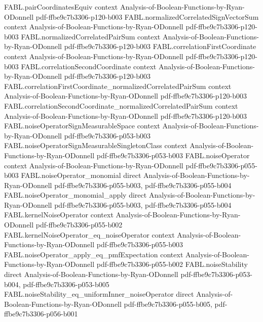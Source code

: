 \begin{theorem}
  {FABL.pairCoordinatesEquiv}
  {context}
  {Analysis-of-Boolean-Functions-by-Ryan-ODonnell}
  {pdf-ffbe9c7b3306-p120-b003}
\proofstep
  {FABL.normalizedCorrelatedSignVectorSum}
  {context}
  {Analysis-of-Boolean-Functions-by-Ryan-ODonnell}
  {pdf-ffbe9c7b3306-p120-b003}
\proofstep
  {FABL.normalizedCorrelatedPairSum}
  {context}
  {Analysis-of-Boolean-Functions-by-Ryan-ODonnell}
  {pdf-ffbe9c7b3306-p120-b003}
\proofstep
  {FABL.correlationFirstCoordinate}
  {context}
  {Analysis-of-Boolean-Functions-by-Ryan-ODonnell}
  {pdf-ffbe9c7b3306-p120-b003}
\proofstep
  {FABL.correlationSecondCoordinate}
  {context}
  {Analysis-of-Boolean-Functions-by-Ryan-ODonnell}
  {pdf-ffbe9c7b3306-p120-b003}
\proofstep
  {FABL.correlationFirstCoordinate_normalizedCorrelatedPairSum}
  {context}
  {Analysis-of-Boolean-Functions-by-Ryan-ODonnell}
  {pdf-ffbe9c7b3306-p120-b003}
\proofstep
  {FABL.correlationSecondCoordinate_normalizedCorrelatedPairSum}
  {context}
  {Analysis-of-Boolean-Functions-by-Ryan-ODonnell}
  {pdf-ffbe9c7b3306-p120-b003}
\proofstep
  {FABL.noiseOperatorSignMeasurableSpace}
  {context}
  {Analysis-of-Boolean-Functions-by-Ryan-ODonnell}
  {pdf-ffbe9c7b3306-p053-b003}
\proofstep
  {FABL.noiseOperatorSignMeasurableSingletonClass}
  {context}
  {Analysis-of-Boolean-Functions-by-Ryan-ODonnell}
  {pdf-ffbe9c7b3306-p053-b003}
\proofstep
  {FABL.noiseOperator}
  {context}
  {Analysis-of-Boolean-Functions-by-Ryan-ODonnell}
  {pdf-ffbe9c7b3306-p055-b003}
\proofstep
  {FABL.noiseOperator_monomial}
  {direct}
  {Analysis-of-Boolean-Functions-by-Ryan-ODonnell}
  {pdf-ffbe9c7b3306-p055-b003,
    pdf-ffbe9c7b3306-p055-b004}
\proofstep
  {FABL.noiseOperator_monomial_apply}
  {direct}
  {Analysis-of-Boolean-Functions-by-Ryan-ODonnell}
  {pdf-ffbe9c7b3306-p055-b003,
    pdf-ffbe9c7b3306-p055-b004}
\proofstep
  {FABL.kernelNoiseOperator}
  {context}
  {Analysis-of-Boolean-Functions-by-Ryan-ODonnell}
  {pdf-ffbe9c7b3306-p055-b002}
\proofstep
  {FABL.kernelNoiseOperator_eq_noiseOperator}
  {context}
  {Analysis-of-Boolean-Functions-by-Ryan-ODonnell}
  {pdf-ffbe9c7b3306-p055-b003}
\proofstep
  {FABL.noiseOperator_apply_eq_pmfExpectation}
  {context}
  {Analysis-of-Boolean-Functions-by-Ryan-ODonnell}
  {pdf-ffbe9c7b3306-p055-b002}
\proofstep
  {FABL.noiseStability}
  {direct}
  {Analysis-of-Boolean-Functions-by-Ryan-ODonnell}
  {pdf-ffbe9c7b3306-p053-b004,
    pdf-ffbe9c7b3306-p053-b005}
\proofstep
  {FABL.noiseStability_eq_uniformInner_noiseOperator}
  {direct}
  {Analysis-of-Boolean-Functions-by-Ryan-ODonnell}
  {pdf-ffbe9c7b3306-p055-b005,
    pdf-ffbe9c7b3306-p056-b001}
\proofstep

\end{theorem}
